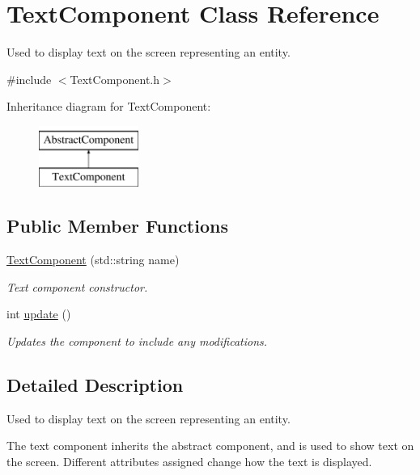 \hypertarget{class_text_component}{\section{Text\-Component Class Reference}
\label{d9/dde/class_text_component}
}


Used to display text on the screen representing an entity.  




{\ttfamily \#include $<$Text\-Component.\-h$>$}

Inheritance diagram for Text\-Component\-:\begin{figure}[H]
\begin{center}
\leavevmode
\includegraphics[height=2.000000cm]{d9/dde/class_text_component}
\end{center}
\end{figure}
\subsection*{Public Member Functions}
\begin{DoxyCompactItemize}
\item 
\hyperlink{class_text_component_ac58d01b01cc22d742cc32822510f3585}{Text\-Component} (std\-::string name)
\begin{DoxyCompactList}\small\item\em Text component constructor. \end{DoxyCompactList}\item 
int \hyperlink{class_text_component_a0157702090c5ab75071448dfefb7196e}{update} ()
\begin{DoxyCompactList}\small\item\em Updates the component to include any modifications. \end{DoxyCompactList}\end{DoxyCompactItemize}


\subsection{Detailed Description}
Used to display text on the screen representing an entity. 

The text component inherits the abstract component, and is used to show text on the screen. Different attributes assigned change how the text is displayed. 

